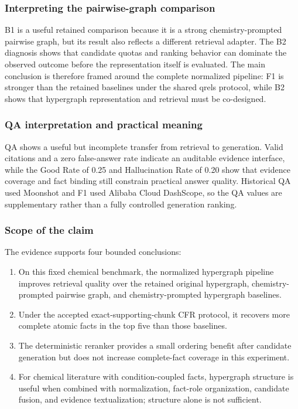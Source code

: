 \subsubsection{Interpreting the pairwise-graph comparison}

B1 is a useful retained comparison because it is a strong chemistry-prompted pairwise graph, but its result also reflects a different retrieval adapter. The B2 diagnosis shows that candidate quotas and ranking behavior can dominate the observed outcome before the representation itself is evaluated. The main conclusion is therefore framed around the complete normalized pipeline: F1 is stronger than the retained baselines under the shared qrels protocol, while B2 shows that hypergraph representation and retrieval must be co-designed.

\subsubsection{QA interpretation and practical meaning}

QA shows a useful but incomplete transfer from retrieval to generation. Valid citations and a zero false-answer rate indicate an auditable evidence interface, while the Good Rate of 0.25 and Hallucination Rate of 0.20 show that evidence coverage and fact binding still constrain practical answer quality. Historical QA used Moonshot and F1 used Alibaba Cloud DashScope, so the QA values are supplementary rather than a fully controlled generation ranking.

\subsubsection{Scope of the claim}

The evidence supports four bounded conclusions:

\begin{enumerate}
\item On this fixed chemical benchmark, the normalized hypergraph pipeline improves retrieval quality over the retained original hypergraph, chemistry-prompted pairwise graph, and chemistry-prompted hypergraph baselines.
\item Under the accepted exact-supporting-chunk CFR protocol, it recovers more complete atomic facts in the top five than those baselines.
\item The deterministic reranker provides a small ordering benefit after candidate generation but does not increase complete-fact coverage in this experiment.
\item For chemical literature with condition-coupled facts, hypergraph structure is useful when combined with normalization, fact-role organization, candidate fusion, and evidence textualization; structure alone is not sufficient.
\end{enumerate}

